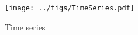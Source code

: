 



\begin{figure}[htb]
\begin{center}
\texttt{[image: ../figs/TimeSeries.pdf]}
\caption{Time series}
\label{fig:timeseries}
\end{center}
\end{figure}

